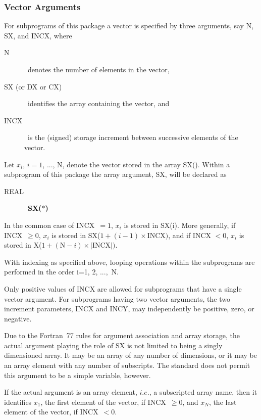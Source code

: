 \documentclass[twoside]{MATH77}
\begin{document}
\subsubsection{Vector Arguments\label{B1}}

For subprograms of this package a vector is specified by three arguments,
say N, SX, and INCX, where

\begin{description}
\item[N]  \ denotes the number of elements in the vector,

\item[SX (or DX or CX)]  \ identifies the array containing the vector, and

\item[INCX]  \ is the (signed) storage increment between successive elements
of the vector.
\end{description}

Let $x_i$, $i = 1$, ..., N, denote the vector stored in the array SX().
Within a subprogram of this package the array argument, SX, will be declared
as
\begin{description}
\item[REAL]  \ {\bf SX($*$) }
\end{description}
In the common case of INCX\ $= 1$, $x_i$ is stored in SX(i). More generally,
if INCX\ $\geq 0$, $x_i$ is stored in SX($1 + (i-1) \times \text{INCX})$, and
if INCX $< 0$, $x_i$ is stored in X($1 + (\text{N}-i) \times |\text{INCX}|).$

With indexing as specified above, looping operations within the
subprograms are performed in the order i=1, 2, ...,~N.

Only positive values of INCX are allowed for subprograms that have a single
vector argument. For subprograms having two vector arguments, the two
increment parameters, INCX and INCY, may independently be positive, zero, or
negative.

Due to the Fortran~77 rules for argument association and array storage, the
actual argument playing the role of SX is not limited to being a singly
dimensioned array. It may be an array of any number of dimensions, or it may
be an array element with any number of subscripts. The standard does not
permit this argument to be a simple variable, however.

If the actual argument is an array element, $i.e.$, a subscripted array
name, then it identifies $x_1$, the first element of the vector, if INCX\ $%
\geq 0$, and $x_N$, the last element of the vector, if INCX\ $< 0.$
\end{document}
